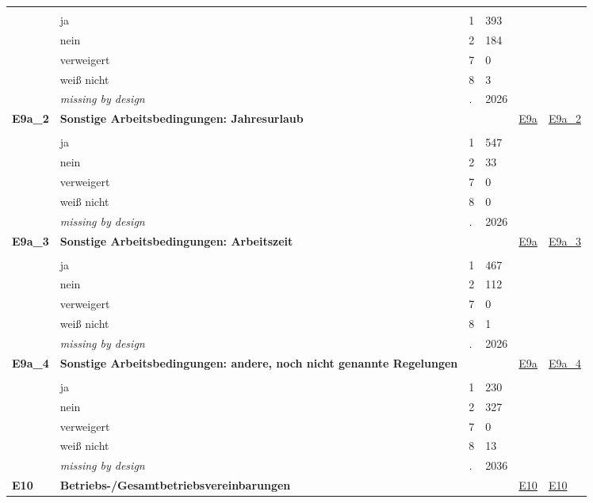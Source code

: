 \begin{longtable}{| L{2.45cm} | L{6cm} | C{1.5cm} | R{1cm} | C{2.25cm} | C{2.25cm} |}
   &  &  &  &  &  \\ 
   & ja & 1 & 393 &  &  \\ 
   & nein & 2 & 184 &  &  \\ 
   & verweigert & 7 & 0 &  &  \\ 
   & weiß nicht & 8 & 3 &  &  \\ 
   & \textit{missing by design} & \textit{.} & 2026 &  &  \\ 
   \midrule
\textbf{E9a\_2}\label{var:E9a:2} & \textbf{Sonstige Arbeitsbedingungen: Jahresurlaub} &  &  & \hyperref[E9a]{E9a} & \hyperref[var:suf:E9a:2]{E9a\_2} \\ 
   &  &  &  &  &  \\ 
   & ja & 1 & 547 &  &  \\ 
   & nein & 2 & 33 &  &  \\ 
   & verweigert & 7 & 0 &  &  \\ 
   & weiß nicht & 8 & 0 &  &  \\ 
   & \textit{missing by design} & \textit{.} & 2026 &  &  \\ 
   \midrule
\textbf{E9a\_3}\label{var:E9a:3} & \textbf{Sonstige Arbeitsbedingungen: Arbeitszeit} &  &  & \hyperref[E9a]{E9a} & \hyperref[var:suf:E9a:3]{E9a\_3} \\ 
   &  &  &  &  &  \\ 
   & ja & 1 & 467 &  &  \\ 
   & nein & 2 & 112 &  &  \\ 
   & verweigert & 7 & 0 &  &  \\ 
   & weiß nicht & 8 & 1 &  &  \\ 
   & \textit{missing by design} & \textit{.} & 2026 &  &  \\ 
   \midrule
\textbf{E9a\_4}\label{var:E9a:4} & \textbf{Sonstige Arbeitsbedingungen: andere, noch nicht genannte Regelungen} &  &  & \hyperref[E9a]{E9a} & \hyperref[var:suf:E9a:4]{E9a\_4} \\ 
   &  &  &  &  &  \\ 
   & ja & 1 & 230 &  &  \\ 
   & nein & 2 & 327 &  &  \\ 
   & verweigert & 7 & 0 &  &  \\ 
   & weiß nicht & 8 & 13 &  &  \\ 
   & \textit{missing by design} & \textit{.} & 2036 &  &  \\ 
   \midrule
\textbf{E10}\label{var:E10} & \textbf{Betriebs-/Gesamtbetriebsvereinbarungen} &  &  & \hyperref[E10]{E10} & \hyperref[var:suf:E10]{E10} \\ 

\end{longtable}
